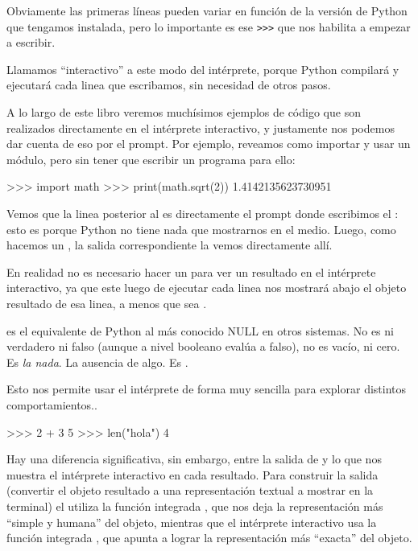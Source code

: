 Obviamente las primeras líneas pueden variar en función de la versión de Python que tengamos instalada, pero lo importante es ese \texttt{\textgreater\textgreater\textgreater} que nos habilita a empezar a escribir.

Llamamos ``interactivo'' a este modo del intérprete, porque Python compilará y ejecutará cada linea que escribamos, sin necesidad de otros pasos. 

A lo largo de este libro veremos muchísimos ejemplos de código que son realizados directamente en el intérprete interactivo, y justamente nos podemos dar cuenta de eso por el prompt. Por ejemplo, reveamos como importar y usar un módulo, pero sin tener que escribir un programa para ello:

\begin{py}
>>> import math
>>> print(math.sqrt(2))
1.4142135623730951
\end{py}

Vemos que la linea posterior al  es directamente el prompt donde escribimos el : esto es porque Python no tiene nada que mostrarnos en el medio. Luego, como hacemos un , la salida correspondiente la vemos directamente allí.

En realidad no es necesario hacer un  para ver un resultado en el intérprete interactivo, ya que este luego de ejecutar cada linea nos mostrará abajo el objeto resultado de esa linea, a menos que sea .

\begin{info}
 es el equivalente de Python al más conocido NULL en otros sistemas. No es ni verdadero ni falso (aunque a nivel booleano evalúa a falso), no es vacío, ni cero. Es \textit{la nada}. La ausencia de algo. Es .
\end{info}

Esto nos permite usar el intérprete de forma muy sencilla para explorar distintos comportamientos..

\begin{py}
>>> 2 + 3
5
>>> len("hola")
4
\end{py}

Hay una diferencia significativa, sin embargo, entre la salida de  y lo que nos muestra el intérprete interactivo en cada resultado. Para construir la salida (convertir el objeto resultado a una representación textual a mostrar en la terminal) el  utiliza la función integrada , que nos deja la representación más ``simple y humana'' del objeto, mientras que el intérprete interactivo usa la función integrada , que apunta a lograr la representación más ``exacta'' del objeto.

